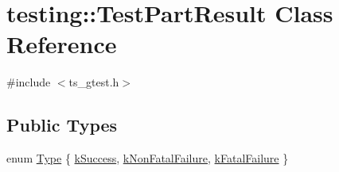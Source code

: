 \hypertarget{classtesting_1_1TestPartResult}{\section{testing\-:\-:Test\-Part\-Result Class Reference}
\label{classtesting_1_1TestPartResult}
}


{\ttfamily \#include $<$ts\-\_\-gtest.\-h$>$}

\subsection*{Public Types}
\begin{DoxyCompactItemize}
\item 
enum \hyperlink{classtesting_1_1TestPartResult_a65ae656b33fdfdfffaf34858778a52d5}{Type} \{ \hyperlink{classtesting_1_1TestPartResult_a65ae656b33fdfdfffaf34858778a52d5a8fa3d06b2baad8bf7c1f17dea314983e}{k\-Success}, 
\hyperlink{classtesting_1_1TestPartResult_a65ae656b33fdfdfffaf34858778a52d5a00a755614f8ec3f78b2e951f8c91cd92}{k\-Non\-Fatal\-Failure}, 
\hyperlink{classtesting_1_1TestPartResult_a65ae656b33fdfdfffaf34858778a52d5ae1bf0b610b697a43fee97628cdab4ea1}{k\-Fatal\-Failure}
 \}
\end{DoxyCompactItemize}
